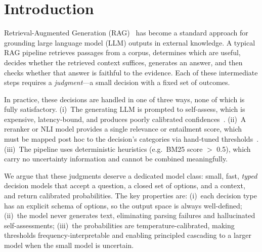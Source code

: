 \documentclass[twocolumn]{ICCKjournal}
\begin{document}


\begin{figure}[b]
	\citationblock
	\vspace*{-.98em}
\end{figure}

\section{Introduction}
\label{sec:intro}

Retrieval-Augmented Generation (RAG)~\cite{lewis2020rag} has become a standard approach for grounding large language model (LLM) outputs in external knowledge. A typical RAG pipeline retrieves passages from a corpus, determines which are useful, decides whether the retrieved context suffices, generates an answer, and then checks whether that answer is faithful to the evidence. Each of these intermediate steps requires a \emph{judgment}---a small decision with a fixed set of outcomes.

In practice, these decisions are handled in one of three ways, none of which is fully satisfactory. (i)~The generating LLM is prompted to self-assess, which is expensive, latency-bound, and produces poorly calibrated confidences~\cite{kadavath2022language, kuhn2023semantic}. (ii)~A reranker or NLI model provides a single relevance or entailment score, which must be mapped post hoc to the decision's categories via hand-tuned thresholds~\cite{bge_m3}. (iii)~The pipeline uses deterministic heuristics (e.g.\ BM25 score $>$ 0.5), which carry no uncertainty information and cannot be combined meaningfully.

We argue that these judgments deserve a dedicated model class: small, fast, \emph{typed} decision models that accept a question, a closed set of options, and a context, and return calibrated probabilities. The key properties are: (i)~each decision type has an explicit schema of options, so the output space is always well-defined; (ii)~the model never generates text, eliminating parsing failures and hallucinated self-assessments; (iii)~the probabilities are temperature-calibrated, making thresholds frequency-interpretable and enabling principled cascading to a larger model when the small model is uncertain.
\end{document}
